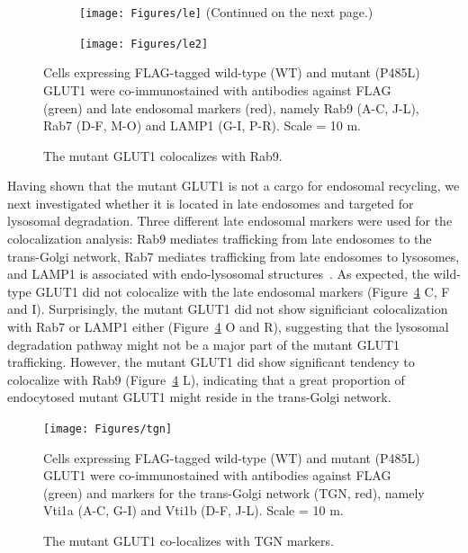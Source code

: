 \begin{figure}[h]
\centering
\begin{subfigure}[h]{\linewidth}
	\texttt{[image: Figures/le]}
	\label{fig:le1}
	\vspace*{-3mm}
	\small \justify
	\centering (Continued on the next page.)
\end{subfigure}
\end{figure}
\begin{figure}[h]\ContinuedFloat
\centering
\begin{subfigure}[h]{\linewidth}
	\texttt{[image: Figures/le2]}
	\label{fig:le2}
\end{subfigure}
\caption{The mutant GLUT1 colocalizes with Rab9.}
\vspace*{-3mm}
\small \justify
Cells expressing FLAG-tagged wild-type (WT) and mutant (P485L) GLUT1 were co-immunostained with antibodies against FLAG (green) and late endosomal markers (red), namely Rab9 (A-C, J-L), Rab7 (D-F, M-O) and LAMP1 (G-I, P-R). Scale = 10 \textmu m.
\label{fig:le}
\end{figure}
Having shown that the mutant GLUT1 is not a cargo for endosomal recycling, we next investigated whether it is located in late endosomes and targeted for lysosomal degradation. Three different late endosomal markers were used for the colocalization analysis: Rab9 mediates trafficking from late endosomes to the trans-Golgi network, Rab7 mediates trafficking from late endosomes to lysosomes, and LAMP1 is associated with endo-lysosomal structures~\cite{Stenmark,Saftig}. As expected, the wild-type GLUT1 did not colocalize with the late endosomal markers (Figure~\ref{fig:le} C, F and I). Surprisingly, the mutant GLUT1 did not show significiant colocalization with Rab7 or LAMP1 either (Figure~\ref{fig:le} O and R), suggesting that the lysosomal degradation pathway might not be a major part of the mutant GLUT1 trafficking. However, the mutant GLUT1 did show significant tendency to colocalize with Rab9 (Figure~\ref{fig:le} L), indicating that a great proportion of endocytosed mutant GLUT1 might reside in the trans-Golgi network.
\begin{figure}[h]
\centering
\texttt{[image: Figures/tgn]}
\caption{The mutant GLUT1 co-localizes with TGN markers.}
\vspace*{-3mm}
\small \justify
Cells expressing FLAG-tagged wild-type (WT) and mutant (P485L) GLUT1 were co-immunostained with antibodies against FLAG (green) and markers for the trans-Golgi network (TGN, red), namely Vti1a (A-C, G-I) and Vti1b (D-F, J-L). Scale = 10 \textmu m.
\label{fig:tgn}
\end{figure}

